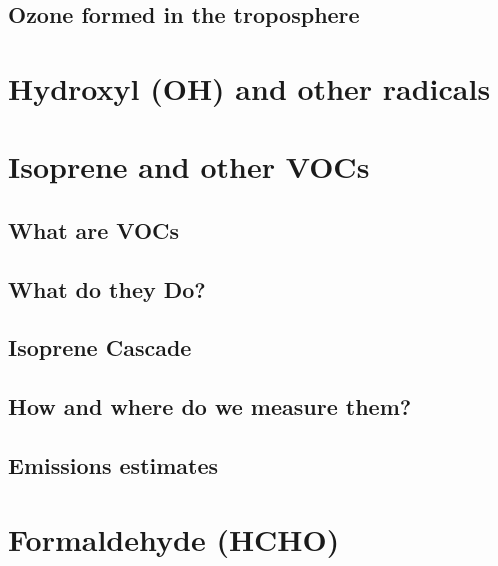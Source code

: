     
    
    
    
    
    
    
  

  \subsection{Ozone formed in the troposphere}
    \label{LR:O3andAQ:BiogenicOzonePrecursors}
    
    
    
\section{Hydroxyl (OH) and other radicals}
  \label{LR:Radicals}
  
  
  
  
  

\section{Isoprene and other VOCs}
  \label{LR:VOCs}
  \subsection{What are VOCs}
    

    
  \subsection{What do they Do?}
    
    
    
  \subsection{Isoprene Cascade}
  
    
  \subsection{How and where do we measure them?}
    

  
  
  \subsection{Emissions estimates}
    \label{LR:VOCs:EmissionsEstimates}
    
    
  
\section{Formaldehyde (HCHO)}
  \label{LR:HCHO}
  
